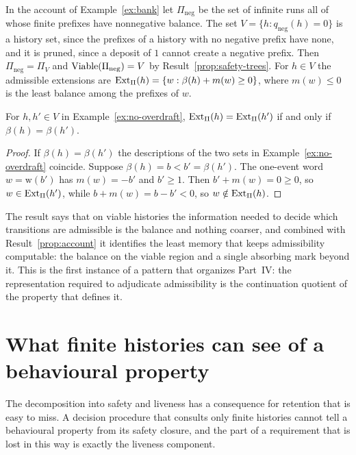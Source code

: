 \begin{example}\label{ex:no-overdraft}
In the account of Example~\ref{ex:bank} let $\Pi_{\mathrm{neg}}$ be the set of infinite runs all of whose finite prefixes have nonnegative balance. The set $V=\{h: q_{\mathrm{neg}}(h)=0\}$ is a history set, since the prefixes of a history with no negative prefix have none, and it is pruned, since a deposit of $1$ cannot create a negative prefix. Then $\Pi_{\mathrm{neg}}=\Pi_V$ and $\operatorname{Viable}(\Pi_{\mathrm{neg}})=V$ by Result~\ref{prop:safety-trees}. For $h\in V$ the admissible extensions are $\operatorname{Ext}_{\Pi}(h)=\{w:\beta(h)+m(w)\ge0\}$, where $m(w)\le0$ is the least balance among the prefixes of $w$.
\end{example}

\begin{newresult}\label{prop:admissible-balance}
For $h,h'\in V$ in Example~\ref{ex:no-overdraft}, $\operatorname{Ext}_{\Pi}(h)=\operatorname{Ext}_{\Pi}(h')$ if and only if $\beta(h)=\beta(h')$.
\end{newresult}
\begin{proof}
If $\beta(h)=\beta(h')$ the descriptions of the two sets in Example~\ref{ex:no-overdraft} coincide. Suppose $\beta(h)=b<b'=\beta(h')$. The one-event word $w=\mathrm{w}(b')$ has $m(w)=-b'$ and $b'\ge1$. Then $b'+m(w)=0\ge0$, so $w\in\operatorname{Ext}_\Pi(h')$, while $b+m(w)=b-b'<0$, so $w\notin\operatorname{Ext}_\Pi(h)$.
\end{proof}

The result says that on viable histories the information needed to decide which transitions are admissible is the balance and nothing coarser, and combined with Result~\ref{prop:account} it identifies the least memory that keeps admissibility computable: the balance on the viable region and a single absorbing mark beyond it. This is the first instance of a pattern that organizes Part~IV: the representation required to adjudicate admissibility is the continuation quotient of the property that defines it.


\section{What finite histories can see of a behavioural property}\label{sec:closure-view}

The decomposition into safety and liveness has a consequence for retention that is easy to miss. A decision procedure that consults only finite histories cannot tell a behavioural property from its safety closure, and the part of a requirement that is lost in this way is exactly the liveness component.

